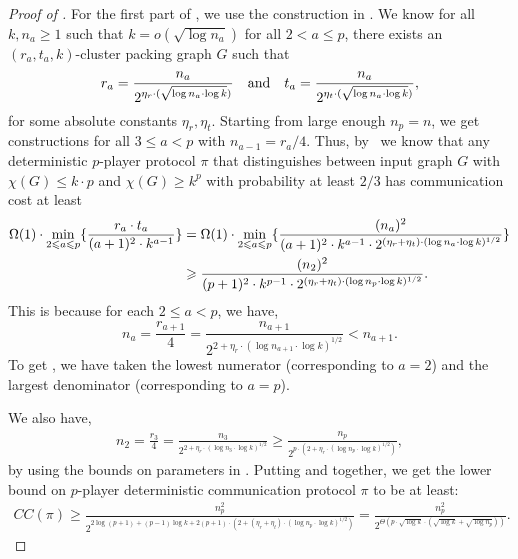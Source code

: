 \documentclass[11pt]{article}
\theoremstyle{definition}
\renewcommand{\leq}{\leqslant}
\renewcommand{\geq}{\geqslant}
\newcommand{\chrom}{\ensuremath{\chi}}
\newcommand{\prot}{\ensuremath{\pi}}
\begin{document}
	\begin{proof}[Proof of ]
		For the first part of , we use the construction in . We know for all $k, n_a \geq 1$ such that $k=o(\sqrt{\log n_a})$ for all $2 < a \leq p$, there exists an $(r_a, t_a, k)$-cluster packing graph $G$ such that 
		\[
		r_a = \frac{n_a}{2^{\eta_r \cdot (\sqrt{\log n_a\cdot\log k})}} \quad \textnormal{and}  \quad
		t_a = \frac{n_a}{2^{\eta_t \cdot (\sqrt{\log n_a\cdot\log k})}},
		\]
		for some absolute constants $\eta_r, \eta_t$. 
		Starting from large enough $n_p=n$, we get constructions for all $3 \leq a < p$ with  $n_{a-1}=r_a/4$. Thus, by~ we know that any deterministic $p$-player protocol $\pi$ that distinguishes between input graph $G$ with $\chrom(G) \leq k\cdot p$ and $\chrom(G)\geq k^p$ with probability at least  $2/3$ has communication cost at least 
		\begin{align}
			\Omega(1)\cdot \min_{2 \leq a\leq p} \{\frac{r_a\cdot t_a}{(a+1)^2\cdot k^{a-1}}\}
			&  = 	\Omega(1)\cdot \min_{2 \leq a\leq p}  \{\frac{(n_a)^2}{(a+1)^2\cdot k^{a-1} \cdot 2^{(\eta_r + \eta_t) \cdot (\log n_a \cdot \log k)^{1/2}}}\} \notag\\
		&	\geq \frac{(n_2)^2}{(p+1)^2 \cdot k^{p-1} \cdot 2^{(\eta_r + \eta_t) \cdot (\log n_p\cdot\log k)^{1/2}}}. \label{eq:interim-3}
		\end{align}
		This is because for each $2\leq a<p$, we have, 
		\[
			n_{a} = \frac{r_{a+1}}{4} = \frac{n_{a+1}}{2^{2 + \eta_r \cdot (\log n_{a+1} \cdot \log k)^{1/2}}} < n_{a+1}.
		\]
		To get , we have taken the lowest numerator (corresponding to $a = 2$) and the largest denominator (corresponding to $a = p$). 
	
	We also have, 
	\begin{align}
		n_2 =\frac{r_3}{4} = \frac{n_3}{2^{2 + \eta_r \cdot (\log n_3 \cdot \log k)^{1/2}}} \geq \frac{n_p}{2^{p \cdot (2+\eta_r \cdot (\log n_{p} \cdot \log k)^{1/2})}},\label{eq:interim-4}
	\end{align}
	by using the bounds on parameters in .
	Putting  and  together, we get the lower bound on $p$-player deterministic communication protocol $\prot$ to be at least:
	\begin{align*}
CC(\prot) \geq \frac{n_p^2}{2^{2 \log (p+1) + (p-1) \log k + 2(p+1) \cdot (2 + (\eta_r + \eta_t) \cdot (\log n_p \cdot \log k)^{1/2})}} = \frac{n_p^2}{2^{\Theta(p \cdot \sqrt{\log k} \cdot (\sqrt{\log k} + \sqrt{\log n_p}))}}.
	\end{align*}
	

\end{proof}
\end{document}
